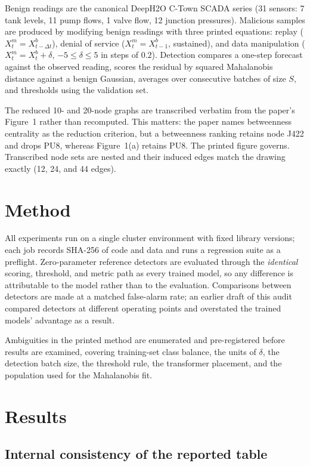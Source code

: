 \documentclass[11pt]{article}
\begin{document}
Benign readings are the canonical DeepH2O C-Town SCADA series (31 sensors:
7 tank levels, 11 pump flows, 1 valve flow, 12 junction pressures). Malicious
samples are produced by modifying benign readings with three printed equations:
replay ($X^m_t = X^b_{t-\Delta t}$), denial of service ($X^m_t = X^b_{t-1}$,
sustained), and data manipulation ($X^m_t = X^b_t + \delta$,
$-5 \le \delta \le 5$ in steps of $0.2$). Detection compares a one-step forecast
against the observed reading, scores the residual by squared Mahalanobis
distance against a benign Gaussian, averages over consecutive batches of size
$S$, and thresholds using the validation set.

The reduced 10- and 20-node graphs are transcribed verbatim from the paper's
Figure~1 rather than recomputed. This matters: the paper names betweenness
centrality as the reduction criterion, but a betweenness ranking retains node
J422 and drops PU8, whereas Figure~1(a) retains PU8. The printed figure governs.
Transcribed node sets are nested and their induced edges match the drawing
exactly (12, 24, and 44 edges).

\section{Method}

All experiments run on a single cluster environment with fixed library versions;
each job records SHA-256 of code and data and runs a regression suite as a
preflight. Zero-parameter reference detectors are evaluated through the
\emph{identical} scoring, threshold, and metric path as every trained model, so
any difference is attributable to the model rather than to the evaluation.
Comparisons between detectors are made at a matched false-alarm rate; an earlier
draft of this audit compared detectors at different operating points and
overstated the trained models' advantage as a result.

Ambiguities in the printed method are enumerated and pre-registered before
results are examined, covering training-set class balance, the units of
$\delta$, the detection batch size, the threshold rule, the transformer
placement, and the population used for the Mahalanobis fit.

\section{Results}

\subsection{Internal consistency of the reported table}
\end{document}
